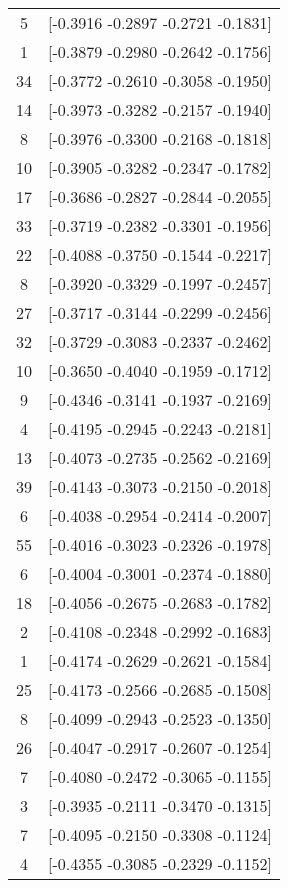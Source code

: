 \documentclass[12pt, fullpage,letterpaper]{article}
\begin{document}
\begin{enumerate}
\begin{enumerate}
{\begin{longtable}{|c|c|}
			  5 &  [-0.3916 -0.2897 -0.2721 -0.1831] \\
			  1 &  [-0.3879 -0.2980 -0.2642 -0.1756] \\
			 34 &  [-0.3772 -0.2610 -0.3058 -0.1950] \\
			 14 &  [-0.3973 -0.3282 -0.2157 -0.1940] \\
			  8 &  [-0.3976 -0.3300 -0.2168 -0.1818] \\
			 10 &  [-0.3905 -0.3282 -0.2347 -0.1782] \\
			 17 &  [-0.3686 -0.2827 -0.2844 -0.2055] \\
			 33 &  [-0.3719 -0.2382 -0.3301 -0.1956] \\
			 22 &  [-0.4088 -0.3750 -0.1544 -0.2217] \\
			  8 &  [-0.3920 -0.3329 -0.1997 -0.2457] \\
			 27 &  [-0.3717 -0.3144 -0.2299 -0.2456] \\
			 32 &  [-0.3729 -0.3083 -0.2337 -0.2462] \\
			 10 &  [-0.3650 -0.4040 -0.1959 -0.1712] \\
			  9 &  [-0.4346 -0.3141 -0.1937 -0.2169] \\
			  4 &  [-0.4195 -0.2945 -0.2243 -0.2181] \\
			 13 &  [-0.4073 -0.2735 -0.2562 -0.2169] \\
			 39 &  [-0.4143 -0.3073 -0.2150 -0.2018] \\
			  6 &  [-0.4038 -0.2954 -0.2414 -0.2007] \\
			 55 &  [-0.4016 -0.3023 -0.2326 -0.1978] \\
			  6 &  [-0.4004 -0.3001 -0.2374 -0.1880] \\
			 18 &  [-0.4056 -0.2675 -0.2683 -0.1782] \\
			  2 &  [-0.4108 -0.2348 -0.2992 -0.1683] \\
			  1 &  [-0.4174 -0.2629 -0.2621 -0.1584] \\
			 25 &  [-0.4173 -0.2566 -0.2685 -0.1508] \\
			  8 &  [-0.4099 -0.2943 -0.2523 -0.1350] \\
			 26 &  [-0.4047 -0.2917 -0.2607 -0.1254] \\
			  7 &  [-0.4080 -0.2472 -0.3065 -0.1155] \\
			  3 &  [-0.3935 -0.2111 -0.3470 -0.1315] \\
			  7 &  [-0.4095 -0.2150 -0.3308 -0.1124] \\
			  4 &  [-0.4355 -0.3085 -0.2329 -0.1152] \\

\end{longtable}}
\end{enumerate}
\end{enumerate}
\end{document}
